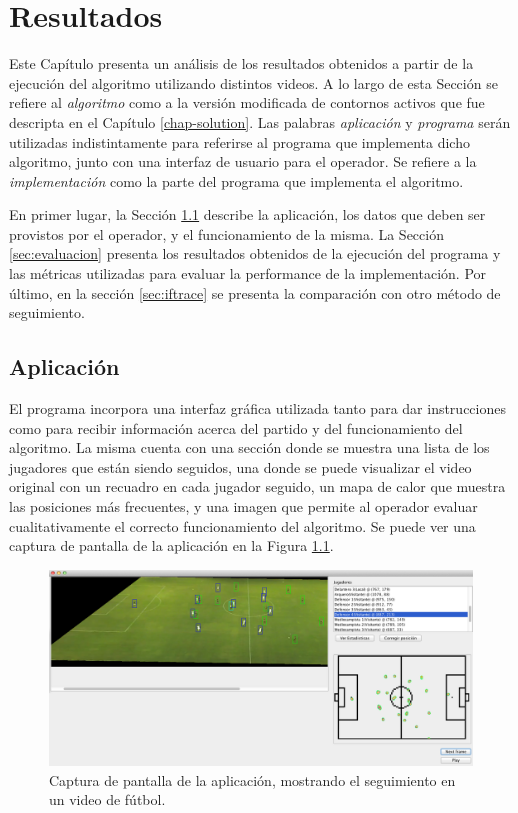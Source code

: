 \chapter{Resultados}
\label{chap-results}

Este Capítulo presenta un análisis de los resultados obtenidos a partir de la
ejecución del algoritmo utilizando distintos videos. A lo largo de esta Sección
se refiere al \textit{algoritmo} como a la versión modificada de contornos
activos que fue descripta en el Capítulo \ref{chap-solution}. Las palabras
\textit{aplicación} y \textit{programa} serán utilizadas indistintamente para
referirse al programa que implementa dicho algoritmo, junto con una interfaz de
usuario para el operador. Se refiere a la \textit{implementación} como la parte
del programa que implementa el algoritmo.

En primer lugar, la Sección \ref{sec:aplicacion} describe la aplicación, los
datos que deben ser provistos por el operador, y el funcionamiento de la misma.
La Sección \ref{sec:evaluacion} presenta los resultados obtenidos de la
ejecución del programa y las métricas utilizadas para evaluar la performance de
la implementación. Por último, en la sección \ref{sec:iftrace} se presenta la
comparación con otro método de seguimiento. 

\section{Aplicación}
\label{sec:aplicacion}

El programa incorpora una interfaz gráfica utilizada tanto para dar
instrucciones como para recibir información acerca del partido y del
funcionamiento del algoritmo. La misma cuenta con una sección donde se muestra
una lista de los jugadores que están siendo seguidos, una donde se puede
visualizar el video original con un recuadro en cada jugador seguido, un mapa de
calor que muestra las posiciones más frecuentes, y una imagen que permite al
operador evaluar cualitativamente el correcto funcionamiento del algoritmo. Se
puede ver una captura de pantalla de la aplicación en la Figura
\ref{fig:screen1}.

\begin{figure}[H]
  \includegraphics[width=\linewidth]{./images/Screen-Boca.png}
  \caption{Captura de pantalla de la aplicación, mostrando el seguimiento en un video de fútbol.}
  \label{fig:screen1}
\end{figure}

